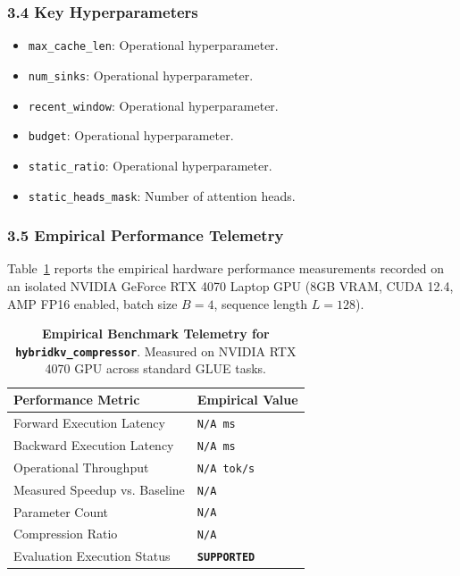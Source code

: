 \subsubsection*{3.4 Key Hyperparameters}
\begin{itemize}
    \item \texttt{max\_cache\_len}: Operational hyperparameter.
    \item \texttt{num\_sinks}: Operational hyperparameter.
    \item \texttt{recent\_window}: Operational hyperparameter.
    \item \texttt{budget}: Operational hyperparameter.
    \item \texttt{static\_ratio}: Operational hyperparameter.
    \item \texttt{static\_heads\_mask}: Number of attention heads.
\end{itemize}

\subsubsection*{3.5 Empirical Performance Telemetry}
Table~\ref{tab:telemetry_hybridkv\_compressor} reports the empirical hardware performance measurements recorded on an isolated NVIDIA GeForce RTX 4070 Laptop GPU (8GB VRAM, CUDA 12.4, AMP FP16 enabled, batch size $B=4$, sequence length $L=128$).

\begin{table}[h]
\centering
\small
\caption{\textbf{Empirical Benchmark Telemetry for \texttt{hybridkv\_compressor}}. Measured on NVIDIA RTX 4070 GPU across standard GLUE tasks.}
\label{tab:telemetry_hybridkv\_compressor}
\begin{tabularx}{\columnwidth}{lX}
\toprule
\textbf{Performance Metric} & \textbf{Empirical Value} \\
\midrule
Forward Execution Latency & \texttt{N/A ms} \\
Backward Execution Latency & \texttt{N/A ms} \\
Operational Throughput & \texttt{N/A tok/s} \\
Measured Speedup vs. Baseline & \texttt{N/A} \\
Parameter Count & \texttt{N/A} \\
Compression Ratio & \texttt{N/A} \\
Evaluation Execution Status & \textbf{\texttt{SUPPORTED}} \\
\bottomrule
\end{tabularx}
\end{table}

